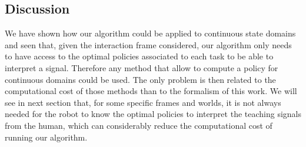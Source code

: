 \visuopti{\newpage}

\subsection{Discussion}

We have shown how our algorithm could be applied to continuous state domains and seen that, given the interaction frame considered, our algorithm only needs to have access to the optimal policies associated to each task to be able to interpret a signal. Therefore any method that allow to compute a policy for continuous domains could be used. The only problem is then related to the computational cost of those methods than to the formalism of this work. We will see in next section that, for some specific frames and worlds, it is not always needed for the robot to know the optimal policies to interpret the teaching signals from the human, which can considerably reduce the computational cost of running our algorithm.
